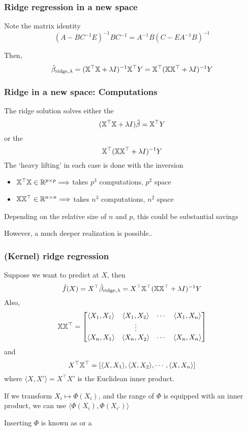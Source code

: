 \documentclass{beamer}
\begin{document}
\begin{frame}
\frametitle{Ridge regression in a new space }
Note the matrix identity
\[
(A - BC^{-1}E)^{-1}BC^{-1} = A^{-1} B (C -  EA^{-1}B)^{-1}
\]

Then,
\[
\hat{\beta}_{\textrm{ridge},\lambda} = (\mathbb{X}^{\top} \mathbb{X} + \lambda I)^{-1} \mathbb{X}^{\top} Y = \mathbb{X}^{\top}( \mathbb{X}\mathbb{X}^{\top} + \lambda I)^{-1}Y
\]
\end{frame}

\begin{frame}
\frametitle{Ridge  in a new space: Computations }
The ridge solution solves either the 
\[
(\mathbb{X}^{\top} \mathbb{X} + \lambda I)\hat\beta =  \mathbb{X}^{\top} Y 
\]
or the 
\[
\mathbb{X}^{\top}( \mathbb{X}\mathbb{X}^{\top} + \lambda I)^{-1}Y
\]
The `heavy lifting' in each case is done with the inversion

\vsp
\begin{itemize}
\item $\mathbb{X}^{\top} \mathbb{X} \in \mathbb{R}^{p \times p} \Longrightarrow$ takes $p^3$ computations, $p^2$ space 
\item $ \mathbb{X} \mathbb{X}^{\top}\in \mathbb{R}^{n \times n} \Longrightarrow$ takes $n^3$ computations, $n^2$ space
\end{itemize}

 Depending on the relative size of $n$ and $p$, this could be substantial
savings

\vsp
However, a much deeper realization is possible..
\end{frame}



\begin{frame}
\frametitle{(Kernel) ridge regression}
Suppose we want to predict at $X$, then 
\[
\hat{f}(X) = X^{\top}\hat{\beta}_{\textrm{ridge},\lambda} =  X^{\top}\mathbb{X}^{\top}( \mathbb{X}\mathbb{X}^{\top} + \lambda I)^{-1}Y
\]
Also,
\[
\mathbb{X}\mathbb{X}^{\top} = 
\begin{bmatrix}
\langle X_1, X_1 \rangle & \langle X_1, X_2 \rangle & \cdots & \langle X_1, X_n \rangle \\
& \vdots && \\
\langle X_n, X_1 \rangle & \langle X_n, X_2 \rangle & \cdots & \langle X_n, X_n \rangle
\end{bmatrix}
\]
and
\[
X^{\top}\mathbb{X}^{\top} = [\langle X, X_1 \rangle,  \langle X, X_2 \rangle, \cdots, \langle X, X_n \rangle]
\]
where $\langle X,X' \rangle = X^{\top}X'$ is the Euclidean inner product.

\vsp
If we transform $X_i \mapsto \Phi(X_i)$, and the range of $\Phi$ is equipped with an inner product, we can use
$\langle \Phi(X_i), \Phi(X_{i'}) \rangle$

\vsp
Inserting $\Phi$ is known as  or a 
\end{frame}
\end{document}
